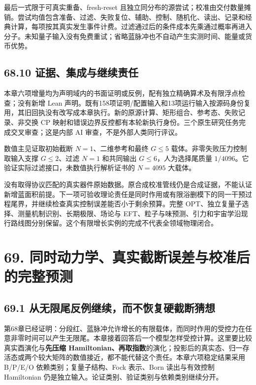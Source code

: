 \documentclass[
  11pt,
  oneside]{book}
\begin{document}
最后一式限于可真实重备、fresh-reset
且独立同分布的源尝试；校准由交付数量摊销。尝试均值包含准备、过滤、失败复位、辅助、控制、随机化、读出、记录和经典计算，每项按其真实发生事件计费。过滤通过后的条件成本先乘通过概率再进入分子。未知量子输入没有免费重试；省略蓝脉冲也不自动产生实测时间、能量或货币优势。

\section{68.10 证据、集成与继续责任}

本章六项增量均为声明域内的书面证明或反例，配有独立精确算术及有限浮点检查；没有新增
Lean
声明。既有158项证明/配置输入和13项运行输入按源码身份复用，其旧回执没有改写成本章执行。新的原源计算、矩形组合、参考态、失败记录、非交换
CP
映射和错误边界反控都有本轮新执行身份。三个原生研究任务完成交叉审查；这是内部
AI 审查，不是外部人类同行评议。

数值主见证取初始截断 \(N=1\)、二维参考和最终 \(G\le5\)
载体。非零失败压力控制取输入支撑 \(G\le2\)、过滤 \(N=1\) 和共同输出
\(G\le6\)，人为选择尾质量
\(1/4096\)。它验证实际过滤接口，未数值执行解析证书的 \(N=4095\) 大载体。

没有取得协议匹配的真实器件原始数据。原合成校准管线仍是合成证据，不能认证新增蓝面积前提。下一项可验收理论责任是同时作用或有限浴删模下的同一干预过程尾界，并继续检查真实控制误差能否小于剩余预算。完整
OPT、独立复量子选择、测量机制识别、长期极限、场论与
EFT、粒子与味预测、引力和宇宙学沿现行路线图分别保留。这个有限增长实例的完成不代表全领域物理闭合。

\chapter{69. 同时动力学、真实截断误差与校准后的完整预测}\label{ch-69}\hypertarget{ch-69}{}

\section{69.1 从无限尾反例继续，而不恢复硬截断猜想}

第68章已经证明：分段红、蓝脉冲允许增长的有限载体，而同时作用的受控力在任意非零时间可以产生无限尾。本章接着回答后一个模型怎样受控计算。这里要比较真实酉演化与\textbf{先压缩
Hamiltonian、再取指数}的演化；投影后的真实态、归一存活态或两个较大矩阵的数值接近，都不能代替这个责任。本章六项稳定结果采用
B/P/E/O 依赖类别；复量子结构、Fock 表示、Born 读出与有效控制 Hamiltonian
仍是独立输入。论证类别、验证类别与依赖类别继续分开。
\end{document}
